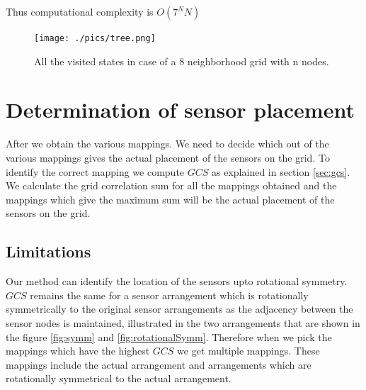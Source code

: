 Thus computational complexity is $O(7^NN)$

\begin{figure}[!ht]
\texttt{[image: ./pics/tree.png]}
\caption{All the visited states in case of a 8 neighborhood grid with n nodes.}
\label{fig:ccO}

\end{figure}

\section{Determination of sensor placement}
\label{ref:rotationalSym}
After we obtain the various mappings. We need to decide which out of the various mappings gives the actual placement of the sensors on the grid. To identify the correct mapping we compute $GCS$ as explained in section \ref{sec:gcs}. We calculate the grid correlation sum for all the mappings obtained and the mappings which give the maximum sum will be the actual placement of the sensors on the grid. 
\subsection{Limitations}

Our method  can identify the location of the sensors upto rotational symmetry. $GCS$ remains the same for a sensor arrangement which is rotationally symmetrically to the original sensor arrangements as the adjacency between the sensor nodes is maintained, illustrated in the two arrangements that are shown in the figure \ref{fig:symm} and \ref{fig:rotationalSymm}. Therefore when we pick the mappings which have the highest $GCS$ we get multiple mappings. These mappings include the actual arrangement and arrangements which are rotationally symmetrical to the actual arrangement.

